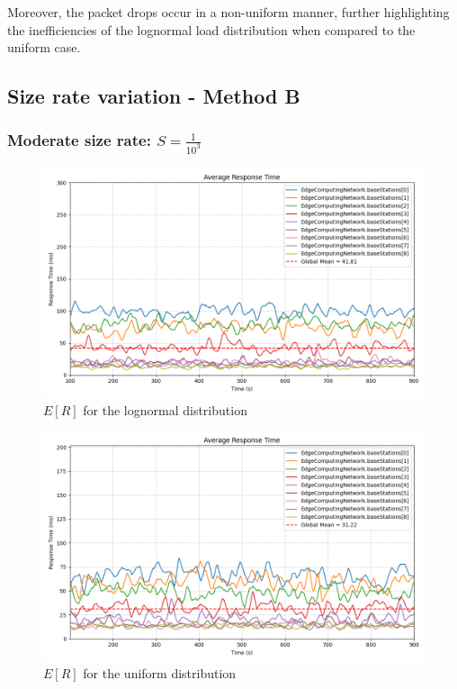 \documentclass{report}
\begin{document}
\begin{flushleft}
Moreover, the packet drops occur in a non-uniform manner, further highlighting the inefficiencies of the lognormal load distribution when compared to the uniform case.
\end{flushleft}

\subsection{Size rate variation - Method B}
\subsubsection*{Moderate size rate: $S=\frac{1}{10^3}$}

\begin{figure}[H]
    \centering
    \includegraphics[width=\textwidth]{img/plots/log_1e3_B/resptime.png}
    \caption{$E[R]$ for the lognormal distribution}
\end{figure}

\begin{figure}[H]
    \centering
    \includegraphics[width=\textwidth]{img/plots/uni_1e3_B/resptime.png}
    \caption{$E[R]$ for the uniform distribution}
\end{figure}
\end{document}
